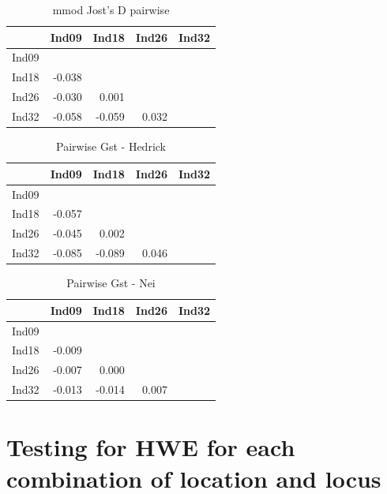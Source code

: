 \documentclass[a4paper]{scrartcl}\usepackage[]{graphicx}\usepackage[]{color}
\begin{document}
\begin{table}[ht]
\centering
\begin{tabular}{rrrrr}
  \hline
 & Ind09 & Ind18 & Ind26 & Ind32 \\ 
  \hline
Ind09 &  &  &  &  \\ 
  Ind18 & -0.038 &  &  &  \\ 
  Ind26 & -0.030 & 0.001 &  &  \\ 
  Ind32 & -0.058 & -0.059 & 0.032 &  \\ 
   \hline
\end{tabular}
\caption{mmod Jost's D pairwise} 
\end{table}
\begin{table}[ht]
\centering
\begin{tabular}{rrrrr}
  \hline
 & Ind09 & Ind18 & Ind26 & Ind32 \\ 
  \hline
Ind09 &  &  &  &  \\ 
  Ind18 & -0.057 &  &  &  \\ 
  Ind26 & -0.045 & 0.002 &  &  \\ 
  Ind32 & -0.085 & -0.089 & 0.046 &  \\ 
   \hline
\end{tabular}
\caption{Pairwise Gst - Hedrick} 
\end{table}
\begin{table}[ht]
\centering
\begin{tabular}{rrrrr}
  \hline
 & Ind09 & Ind18 & Ind26 & Ind32 \\ 
  \hline
Ind09 &  &  &  &  \\ 
  Ind18 & -0.009 &  &  &  \\ 
  Ind26 & -0.007 & 0.000 &  &  \\ 
  Ind32 & -0.013 & -0.014 & 0.007 &  \\ 
   \hline
\end{tabular}
\caption{Pairwise Gst - Nei} 
\end{table}





\FloatBarrier
\section{Testing for HWE for each combination of location and locus}
\end{document}
